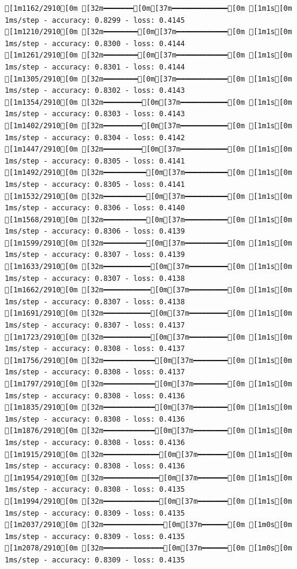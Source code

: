 \documentclass[
  letterpaper,
  DIV=11,
  numbers=noendperiod]{scrartcl}
\begin{document}
\begin{verbatim}
[1m1162/2910[0m [32m━━━━━━━[0m[37m━━━━━━━━━━━━━[0m [1m1s[0m 1ms/step - accuracy: 0.8299 - loss: 0.4145
[1m1210/2910[0m [32m━━━━━━━━[0m[37m━━━━━━━━━━━━[0m [1m1s[0m 1ms/step - accuracy: 0.8300 - loss: 0.4144
[1m1261/2910[0m [32m━━━━━━━━[0m[37m━━━━━━━━━━━━[0m [1m1s[0m 1ms/step - accuracy: 0.8301 - loss: 0.4144
[1m1305/2910[0m [32m━━━━━━━━[0m[37m━━━━━━━━━━━━[0m [1m1s[0m 1ms/step - accuracy: 0.8302 - loss: 0.4143
[1m1354/2910[0m [32m━━━━━━━━━[0m[37m━━━━━━━━━━━[0m [1m1s[0m 1ms/step - accuracy: 0.8303 - loss: 0.4143
[1m1402/2910[0m [32m━━━━━━━━━[0m[37m━━━━━━━━━━━[0m [1m1s[0m 1ms/step - accuracy: 0.8304 - loss: 0.4142
[1m1447/2910[0m [32m━━━━━━━━━[0m[37m━━━━━━━━━━━[0m [1m1s[0m 1ms/step - accuracy: 0.8305 - loss: 0.4141
[1m1492/2910[0m [32m━━━━━━━━━━[0m[37m━━━━━━━━━━[0m [1m1s[0m 1ms/step - accuracy: 0.8305 - loss: 0.4141
[1m1532/2910[0m [32m━━━━━━━━━━[0m[37m━━━━━━━━━━[0m [1m1s[0m 1ms/step - accuracy: 0.8306 - loss: 0.4140
[1m1568/2910[0m [32m━━━━━━━━━━[0m[37m━━━━━━━━━━[0m [1m1s[0m 1ms/step - accuracy: 0.8306 - loss: 0.4139
[1m1599/2910[0m [32m━━━━━━━━━━[0m[37m━━━━━━━━━━[0m [1m1s[0m 1ms/step - accuracy: 0.8307 - loss: 0.4139
[1m1633/2910[0m [32m━━━━━━━━━━━[0m[37m━━━━━━━━━[0m [1m1s[0m 1ms/step - accuracy: 0.8307 - loss: 0.4138
[1m1662/2910[0m [32m━━━━━━━━━━━[0m[37m━━━━━━━━━[0m [1m1s[0m 1ms/step - accuracy: 0.8307 - loss: 0.4138
[1m1691/2910[0m [32m━━━━━━━━━━━[0m[37m━━━━━━━━━[0m [1m1s[0m 1ms/step - accuracy: 0.8307 - loss: 0.4137
[1m1723/2910[0m [32m━━━━━━━━━━━[0m[37m━━━━━━━━━[0m [1m1s[0m 1ms/step - accuracy: 0.8308 - loss: 0.4137
[1m1756/2910[0m [32m━━━━━━━━━━━━[0m[37m━━━━━━━━[0m [1m1s[0m 1ms/step - accuracy: 0.8308 - loss: 0.4137
[1m1797/2910[0m [32m━━━━━━━━━━━━[0m[37m━━━━━━━━[0m [1m1s[0m 1ms/step - accuracy: 0.8308 - loss: 0.4136
[1m1835/2910[0m [32m━━━━━━━━━━━━[0m[37m━━━━━━━━[0m [1m1s[0m 1ms/step - accuracy: 0.8308 - loss: 0.4136
[1m1876/2910[0m [32m━━━━━━━━━━━━[0m[37m━━━━━━━━[0m [1m1s[0m 1ms/step - accuracy: 0.8308 - loss: 0.4136
[1m1915/2910[0m [32m━━━━━━━━━━━━━[0m[37m━━━━━━━[0m [1m1s[0m 1ms/step - accuracy: 0.8308 - loss: 0.4136
[1m1954/2910[0m [32m━━━━━━━━━━━━━[0m[37m━━━━━━━[0m [1m1s[0m 1ms/step - accuracy: 0.8308 - loss: 0.4135
[1m1994/2910[0m [32m━━━━━━━━━━━━━[0m[37m━━━━━━━[0m [1m1s[0m 1ms/step - accuracy: 0.8309 - loss: 0.4135
[1m2037/2910[0m [32m━━━━━━━━━━━━━━[0m[37m━━━━━━[0m [1m0s[0m 1ms/step - accuracy: 0.8309 - loss: 0.4135
[1m2078/2910[0m [32m━━━━━━━━━━━━━━[0m[37m━━━━━━[0m [1m0s[0m 1ms/step - accuracy: 0.8309 - loss: 0.4135

\end{verbatim}
\end{document}
